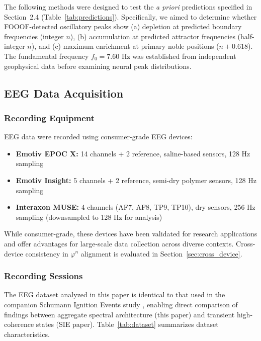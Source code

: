 \documentclass[11pt,a4paper]{article}
\newcommand{\phisym}{\varphi}
\newcommand{\fzero}{f_0}
\begin{document}
The following methods were designed to test the \textit{a priori} predictions specified in Section~2.4 (Table~\ref{tab:predictions}). Specifically, we aimed to determine whether FOOOF-detected oscillatory peaks show (a) depletion at predicted boundary frequencies (integer $n$), (b) accumulation at predicted attractor frequencies (half-integer $n$), and (c) maximum enrichment at primary noble positions ($n + 0.618$). The fundamental frequency $\fzero = 7.60$ Hz was established from independent geophysical data before examining neural peak distributions.

\subsection{EEG Data Acquisition}

\subsubsection{Recording Equipment}

EEG data were recorded using consumer-grade EEG devices:

\begin{itemize}
    \item \textbf{Emotiv EPOC X:} 14 channels + 2 reference, saline-based sensors, 128 Hz sampling
    \item \textbf{Emotiv Insight:} 5 channels + 2 reference, semi-dry polymer sensors, 128 Hz sampling
    \item \textbf{Interaxon MUSE:} 4 channels (AF7, AF8, TP9, TP10), dry sensors, 256 Hz sampling (downsampled to 128 Hz for analysis)
\end{itemize}

While consumer-grade, these devices have been validated for research applications \citep{badcock2013, debener2012, krigolson2017} and offer advantages for large-scale data collection across diverse contexts. Cross-device consistency in $\phisym^n$ alignment is evaluated in Section~\ref{sec:cross_device}.

\subsubsection{Recording Sessions}

The EEG dataset analyzed in this paper is identical to that used in the companion Schumann Ignition Events study \citep{lacy_sie}, enabling direct comparison of findings between aggregate spectral architecture (this paper) and transient high-coherence states (SIE paper). Table~\ref{tab:dataset} summarizes dataset characteristics.
\end{document}
